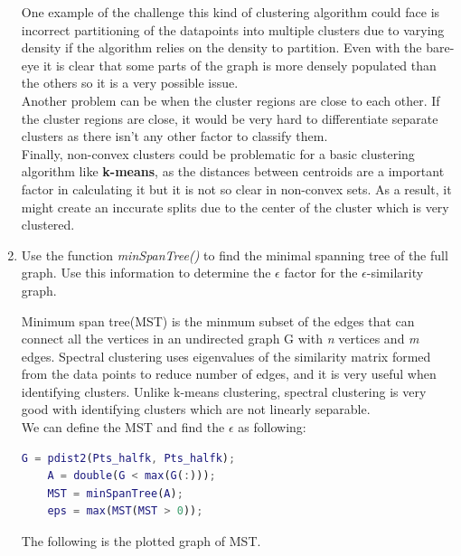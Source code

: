 \documentclass[unicode,11pt,a4paper,oneside,numbers=endperiod,openany]{scrartcl}
\begin{document}
\begin{enumerate}
One example of the challenge this kind of clustering algorithm could face is incorrect partitioning of the datapoints into multiple clusters due to varying density if the algorithm relies on the density to partition. Even with the bare-eye it is clear that some parts of the graph is more densely populated than the others so it is a very possible issue. \\

Another problem can be when the cluster regions are close to each other. If the cluster regions are close, it would be very hard to differentiate separate clusters as there isn't any other factor to classify them.\\

Finally, non-convex clusters could be problematic for a basic clustering algorithm like \textbf{k-means}, as the distances between centroids are a important factor in calculating it but it is not so clear in non-convex sets. As a result, it might create an inccurate splits due to the center of the cluster which is very clustered.\\

 \item {Use the function \textit{minSpanTree()} to find the minimal spanning tree of the full graph. Use this information
to determine the ${\epsilon}$ factor for the ${\epsilon}$-similarity graph.}

Minimum span tree(MST) is the minmum subset of the edges that can connect all the vertices in an undirected graph G with \textit{n} vertices and \textit{m} edges. Spectral clustering uses eigenvalues of the similarity matrix formed from the data points to reduce number of edges, and it is very useful when identifying clusters. Unlike k-means clustering, spectral clustering is very good with identifying clusters which are not linearly separable. \\

We can define the MST and find the ${\epsilon}$ as following:\\
 \begin{lstlisting}[language=Matlab]
    G = pdist2(Pts_halfk, Pts_halfk);
    A = double(G < max(G(:)));
    MST = minSpanTree(A);
    eps = max(MST(MST > 0));
 \end{lstlisting}
 
 The following is the plotted graph of MST.
 

\end{enumerate}
\end{document}
